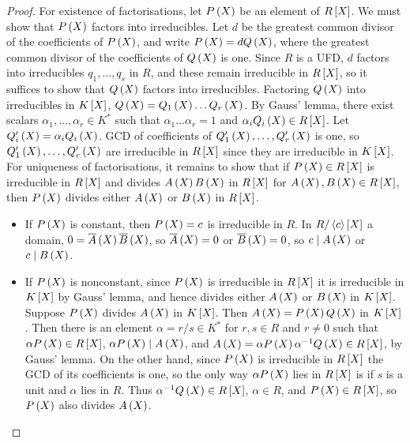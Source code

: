 \begin{proof}
For existence of factorisations, let $ P\br{X} $ be an element of $ R\sbr{X} $. We must show that $ P\br{X} $ factors into irreducibles. Let $ d $ be the greatest common divisor of the coefficients of $ P\br{X} $, and write $ P\br{X} = dQ\br{X} $, where the greatest common divisor of the coefficients of $ Q\br{X} $ is one. Since $ R $ is a UFD, $ d $ factors into irreducibles $ q_1, \dots, q_s $ in $ R $, and these remain irreducible in $ R\sbr{X} $, so it suffices to show that $ Q\br{X} $ factors into irreducibles. Factoring $ Q\br{X} $ into irreducibles in $ K\sbr{X} $, $ Q\br{X} = Q_1\br{X} \dots Q_r\br{X} $. By Gauss' lemma, there exist scalars $ \alpha_1, \dots, \alpha_r \in K^* $ such that $ \alpha_1 \dots \alpha_r = 1 $ and $ \alpha_iQ_i\br{X} \in R\sbr{X} $. Let $ Q'_i \br{X} = \alpha_iQ_i\br{X} $. GCD of coefficients of $ Q'_1\br{X}, \dots, Q'_r\br{X} $ is one, so $ Q'_1\br{X}, \dots, Q'_r\br{X} $ are irreducible in $ R\sbr{X} $ since they are irreducible in $ K\sbr{X} $. For uniqueness of factorisations, it remains to show that if $ P\br{X} \in R\sbr{X} $ is irreducible in $ R\sbr{X} $ and divides $ A\br{X}B\br{X} $ in $ R\sbr{X} $ for $ A\br{X}, B\br{X} \in R\sbr{X} $, then $ P\br{X} $ divides either $ A\br{X} $ or $ B\br{X} $ in $ R\sbr{X} $.
\begin{itemize}
\item If $ P\br{X} $ is constant, then $ P\br{X} = c $ is irreducible in $ R $. In $ R / \abr{c}\sbr{X} $ a domain, $ 0 = \overline{A}\br{X}\overline{B}\br{X} $, so $ \overline{A}\br{X} = 0 $ or $ \overline{B}\br{X} = 0 $, so $ c \mid A\br{X} $ or $ c \mid B\br{X} $.
\item If $ P\br{X} $ is nonconstant, since $ P\br{X} $ is irreducible in $ R\sbr{X} $ it is irreducible in $ K\sbr{X} $ by Gauss' lemma, and hence divides either $ A\br{X} $ or $ B\br{X} $ in $ K\sbr{X} $. Suppose $ P\br{X} $ divides $ A\br{X} $ in $ K\sbr{X} $. Then $ A\br{X} = P\br{X}Q\br{X} $ in $ K\sbr{X} $. Then there is an element $ \alpha = r / s \in K^* $ for $ r, s \in R $ and $ r \ne 0 $ such that $ \alpha P\br{X} \in R\sbr{X} $, $ \alpha P\br{X} \mid A\br{X} $, and $ A\br{X} = \alpha P\br{X}\alpha^{-1} Q\br{X} \in R\sbr{X} $, by Gauss' lemma. On the other hand, since $ P\br{X} $ is irreducible in $ R\sbr{X} $ the GCD of its coefficients is one, so the only way $ \alpha P\br{X} $ lies in $ R\sbr{X} $ is if $ s $ is a unit and $ \alpha $ lies in $ R $. Thus $ \alpha^{-1}Q\br{X} \in R\sbr{X} $, $ \alpha \in R $, and $ P\br{X} \in R\sbr{X} $, so $ P\br{X} $ also divides $ A\br{X} $.
\end{itemize}
\end{proof}

